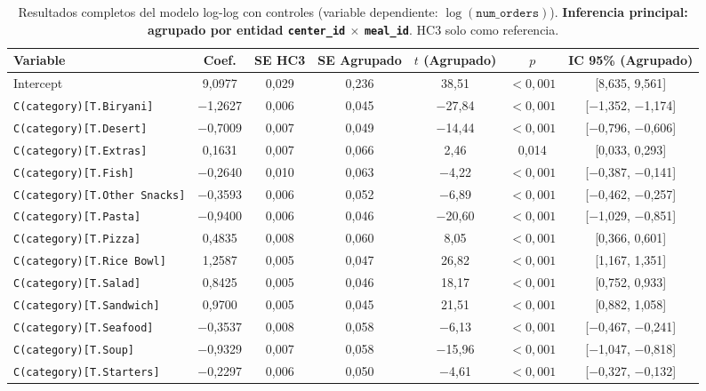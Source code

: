 \documentclass[doc, a4paper, biblatex, floatsintext, longtable, babel]{apa7}
\begin{document}
\begin{table}[!htbp]
\centering
\caption{Resultados completos del modelo log-log con controles (variable dependiente: $\log(\texttt{num\_orders})$). \textbf{Inferencia principal: agrupado por entidad \texttt{center\_id} $\times$ \texttt{meal\_id}}. HC3 solo como referencia.}
\label{tab:modelo_principal_completa}
\begin{adjustwidth}{-1.2cm}{-1.2cm}
\centering
\footnotesize
\begin{tabular}{lcccccc}
\toprule
Variable & Coef. & SE HC3 & SE Agrupado & $t$ (Agrupado) & $p$ & IC 95\% (Agrupado) \\
\midrule
Intercept & 9,0977 & 0,029 & 0,236 & 38,51 & $<0,001$ & [8,635, 9,561] \\
\texttt{C(category)[T.Biryani]} & $-$1,2627 & 0,006 & 0,045 & $-$27,84 & $<0,001$ & [$-$1,352, $-$1,174] \\
\texttt{C(category)[T.Desert]} & $-$0,7009 & 0,007 & 0,049 & $-$14,44 & $<0,001$ & [$-$0,796, $-$0,606] \\
\texttt{C(category)[T.Extras]} & 0,1631 & 0,007 & 0,066 & 2,46 & 0,014 & [0,033, 0,293] \\
\texttt{C(category)[T.Fish]} & $-$0,2640 & 0,010 & 0,063 & $-$4,22 & $<0,001$ & [$-$0,387, $-$0,141] \\
\texttt{C(category)[T.Other Snacks]} & $-$0,3593 & 0,006 & 0,052 & $-$6,89 & $<0,001$ & [$-$0,462, $-$0,257] \\
\texttt{C(category)[T.Pasta]} & $-$0,9400 & 0,006 & 0,046 & $-$20,60 & $<0,001$ & [$-$1,029, $-$0,851] \\
\texttt{C(category)[T.Pizza]} & 0,4835 & 0,008 & 0,060 & 8,05 & $<0,001$ & [0,366, 0,601] \\
\texttt{C(category)[T.Rice Bowl]} & 1,2587 & 0,005 & 0,047 & 26,82 & $<0,001$ & [1,167, 1,351] \\
\texttt{C(category)[T.Salad]} & 0,8425 & 0,005 & 0,046 & 18,17 & $<0,001$ & [0,752, 0,933] \\
\texttt{C(category)[T.Sandwich]} & 0,9700 & 0,005 & 0,045 & 21,51 & $<0,001$ & [0,882, 1,058] \\
\texttt{C(category)[T.Seafood]} & $-$0,3537 & 0,008 & 0,058 & $-$6,13 & $<0,001$ & [$-$0,467, $-$0,241] \\
\texttt{C(category)[T.Soup]} & $-$0,9329 & 0,007 & 0,058 & $-$15,96 & $<0,001$ & [$-$1,047, $-$0,818] \\
\texttt{C(category)[T.Starters]} & $-$0,2297 & 0,006 & 0,050 & $-$4,61 & $<0,001$ & [$-$0,327, $-$0,132] \\

\end{tabular}
\end{adjustwidth}
\end{table}
\end{document}
